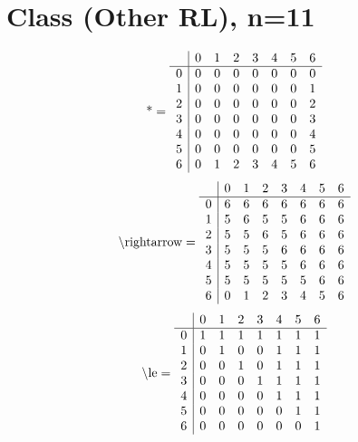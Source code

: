 \documentclass[11pt]{article}
\begin{document}
\section{Class (Other RL), n=11}
\[\text{*} = 
\begin{array}{r | r r r r r r r}
 & 0 & 1 & 2 & 3 & 4 & 5 & 6 \\ \hline
0 & 0 & 0 & 0 & 0 & 0 & 0 & 0 \\
1 & 0 & 0 & 0 & 0 & 0 & 0 & 1 \\
2 & 0 & 0 & 0 & 0 & 0 & 0 & 2 \\
3 & 0 & 0 & 0 & 0 & 0 & 0 & 3 \\
4 & 0 & 0 & 0 & 0 & 0 & 0 & 4 \\
5 & 0 & 0 & 0 & 0 & 0 & 0 & 5 \\
6 & 0 & 1 & 2 & 3 & 4 & 5 & 6 \\
\end{array}
\]
\[\text{\textbackslash rightarrow} = 
\begin{array}{r | r r r r r r r}
 & 0 & 1 & 2 & 3 & 4 & 5 & 6 \\ \hline
0 & 6 & 6 & 6 & 6 & 6 & 6 & 6 \\
1 & 5 & 6 & 5 & 5 & 6 & 6 & 6 \\
2 & 5 & 5 & 6 & 5 & 6 & 6 & 6 \\
3 & 5 & 5 & 5 & 6 & 6 & 6 & 6 \\
4 & 5 & 5 & 5 & 5 & 6 & 6 & 6 \\
5 & 5 & 5 & 5 & 5 & 5 & 6 & 6 \\
6 & 0 & 1 & 2 & 3 & 4 & 5 & 6 \\
\end{array}
\]
\[\text{\textbackslash le} = 
\begin{array}{r | r r r r r r r}
 & 0 & 1 & 2 & 3 & 4 & 5 & 6 \\ \hline
0 & 1 & 1 & 1 & 1 & 1 & 1 & 1 \\
1 & 0 & 1 & 0 & 0 & 1 & 1 & 1 \\
2 & 0 & 0 & 1 & 0 & 1 & 1 & 1 \\
3 & 0 & 0 & 0 & 1 & 1 & 1 & 1 \\
4 & 0 & 0 & 0 & 0 & 1 & 1 & 1 \\
5 & 0 & 0 & 0 & 0 & 0 & 1 & 1 \\
6 & 0 & 0 & 0 & 0 & 0 & 0 & 1 \\
\end{array}
\]
\end{document}
